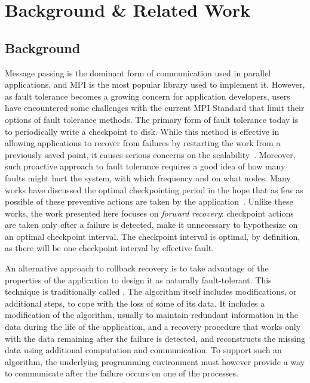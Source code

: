 \section{Background \& Related Work}
\label{sect:background}



\subsection*{Background}

Message passing is the dominant form of communication used in parallel
applications, and MPI is the most popular library used to implement
it. However, as fault tolerance becomes a growing concern for
application developers, users have encountered some challenges with
the current MPI Standard that limit their options of fault tolerance
methods. The primary form of fault tolerance today is to periodically
write a checkpoint to disk.  While this method is effective in
allowing applications to recover from failures by restarting the work
from a previously saved point, it causes serious concerns on the
scalability~\cite{ExaScaleResilience09}. Moreover, such proactive
approach to fault tolerance requires a good idea of how many faults
might hurt the system, with which frequency and on what nodes. Many
works have discussed the optimal checkpointing period in the hope that
as few as possible of these preventive actions are taken by the
application~\cite{Young:1974, Gelenbe:1979, Plank01, Daly:2006,
  PreventiveCheckpointing11}. Unlike these works, the work presented
here focuses on {\it forward recovery}: checkpoint actions are taken
only {\emph after} a failure is detected, make it unnecessary to
hypothesize on an optimal checkpoint interval. The checkpoint interval
is optimal, by definition, as there will be one checkpoint interval by
effective fault.

An alternative approach to rollback recovery is to take advantage of
the properties of the application to design it as naturally fault-tolerant. This
technique is traditionally called \abft \cite{huang1984algorithm}. The
algorithm itself includes modifications, or additional steps, to cope
with the loss of some of its data. It includes a modification of the
algorithm, usually to maintain redundant information in the data
during the life of the application, and a recovery procedure that
works only with the data remaining after the failure is detected, and
reconstructs the missing data using additional computation and
communication. To support such an algorithm, the underlying
programming environment must however provide a way to communicate
after the failure occurs on one of the processes.

